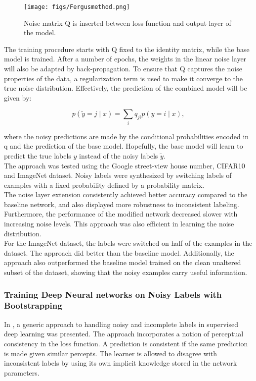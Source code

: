 \begin{figure}
\begin{center}
\texttt{[image: figs/Fergusmethod.png]}
\caption[Noise matrix Q]{Noise matrix Q is inserted between loss function and output layer of the model.}
\label{fig:fergus_method}
\end{center}
\end{figure}

The training procedure starts with Q fixed to the identity matrix, while the base model is trained. After a number of epochs, the weights in the linear noise layer will also be adapted by back-propagation. To ensure that Q captures the noise properties of the data, a regularization term is used to make it converge to the true noise distribution. Effectively, the prediction of the combined model will be given by:

$$p(\tilde{y} = j \mid x) = \sum_{i} q_{ji}p(y = i \mid x),$$ 

where the noisy predictions are made by the conditional probabilities encoded in q and the prediction of the base model. Hopefully, the base model will learn to predict the true labels $y$ instead of the noisy labels $\tilde{y}$.  \\

The approach was tested using the Google street-view house number, CIFAR10 and ImageNet dataset. Noisy labels were synthesized by switching labels of examples with a fixed probability defined by a probability matrix. \\

The noise layer extension consistently achieved better accuracy compared to the baseline network, and also displayed more robustness to inconsistent labeling. Furthermore, the performance of the modified network decreased slower with increasing noise levels. This approach was also efficient in learning the noise distribution. \\

For the ImageNet dataset, the labels were switched on half of the examples in the dataset. The approach did better than the baseline model. Additionally, the approach also outperformed the baseline model trained on the clean unaltered subset of the dataset, showing that the noisy examples carry useful information.


\subsubsection{Training Deep Neural networks on Noisy Labels with Bootstrapping}
In \cite{Reed_noisy_labels_bootstrapping}, a generic approach to handling noisy and incomplete labels in supervised deep learning was presented. The approach incorporates a notion of perceptual consistency in the loss function. A prediction is consistent if the same prediction is made given similar percepts. The learner is allowed to disagree with inconsistent labels by using its own implicit knowledge stored in the network parameters.\\ 

